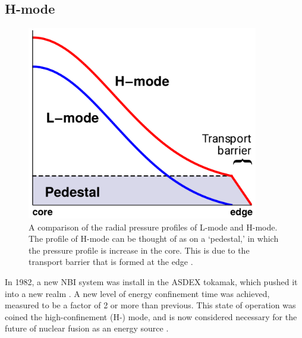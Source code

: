 \documentclass[a4paper]{article}
\begin{document}
\subsection{H-mode}
\begin{figure}[b]
\begin{minipage}{0.48\linewidth}
	\centering
	\includegraphics[width=0.9\textwidth]{../../Graphics/L-mode_H-mode_compare.png}
\end{minipage}
\hfill
\begin{minipage}{0.48\linewidth}
	\caption{A comparison of the radial pressure profiles of L-mode and H-mode.
	The profile of H-mode can be thought of as on a `pedestal,' in which the pressure profile is increase in the core.
	This is due to the transport barrier that is formed at the edge \cite{weymiens_bifurcation_2014}.}
	\label{fig:L-mode_H-mode_compare}
\end{minipage}
\end{figure}

In 1982, a new NBI system was install in the ASDEX tokamak, which pushed it into a new realm \cite{arnoux_how_2009}.
A new level of energy confinement time was achieved, measured to be a factor of 2 or more than previous.
This state of operation was coined the high-confinement (H-) mode, and is now considered necessary for the future of nuclear fusion as an energy source \cite{wagner_development_1984}.
\end{document}
